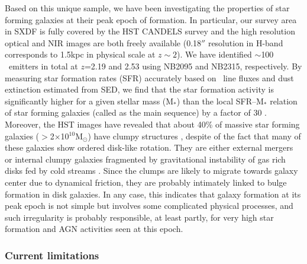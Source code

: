 Based on this unique sample, we have been investigating the properties
of star forming galaxies at their peak epoch of formation. 
In particular, our survey area in SXDF is fully covered by the HST
CANDELS survey \citep{grogin11} 
and the high resolution optical and NIR images are both freely available 
(0.18$''$ resolution in H-band corresponds to 1.5kpc in physical scale
at $z\sim2$). 
We have identified $\sim$100 \ha\ emitters in total at $z$=2.19 and 2.53
using NB2095 and NB2315, respectively.
By measuring star formation rates (SFR) accurately based on \ha\ line
fluxes and dust extinction estimated from SED, 
we find that the star formation activity is significantly higher for a
given stellar mass (M$_{*}$) than the local SFR--M$_{*}$ relation of
star forming galaxies (called as the main sequence) by a factor of 30
\citep{koyama13b}.
Moreover, the HST images have revealed that about 40\% of massive star
forming galaxies ($>$2$\times$10$^{10}$M$_{\odot}$) have clumpy
structures \citep[Fig.\ 4;][]{tadaki13, tadaki14}, 
despite of the fact that many of these galaxies show ordered disk-like
rotation. They are either external mergers or internal clumpy galaxies
fragmented by gravitational instability of gas rich disks 
\citep{genzel11} fed by cold streams \citep{dekel09}.
Since the clumps are likely to migrate towards galaxy center due to
dynamical friction, they are probably intimately linked to bulge
formation in disk galaxies. In any case, this indicates that galaxy
formation at its peak epoch is not simple but involves some complicated
physical processes, and such irregularity is probably responsible, at
least partly, for very high star formation and AGN activities seen at
this epoch. 

\subsubsection{Current limitations}

